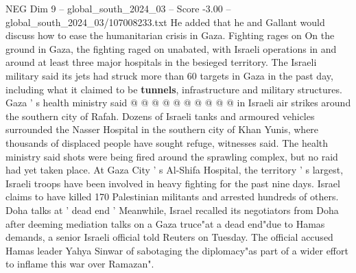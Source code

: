 \begin{textsample}{NEG Dim 9 – global\_south\_2024\_03 – Score -3.00 – global\_south\_2024\_03/107008233.txt}
He added that he and Gallant would discuss how to ease the humanitarian crisis in Gaza.
Fighting rages on On the ground in Gaza, the fighting raged on unabated, with Israeli operations in and around at least three major hospitals in the besieged territory.
The Israeli military said its jets had struck more than 60 targets in Gaza in the past day, including what it claimed to be \textbf{tunnels}, infrastructure and military structures.
Gaza ' s health ministry said @ @ @ @ @ @ @ @ @ @ in Israeli air strikes around the southern city of Rafah.
Dozens of Israeli tanks and armoured vehicles surrounded the Nasser Hospital in the southern city of Khan Yunis, where thousands of displaced people have sought refuge, witnesses said.
The health ministry said shots were being fired around the sprawling complex, but no raid had yet taken place.
At Gaza City ' s Al-Shifa Hospital, the territory ' s largest, Israeli troops have been involved in heavy fighting for the past nine days.
Israel claims to have killed 170 Palestinian militants and arrested hundreds of others.
Doha talks at ' dead end ' Meanwhile, Israel recalled its negotiators from Doha after deeming mediation talks on a Gaza truce"at a dead end"due to Hamas demands, a senior Israeli official told Reuters on Tuesday.
The official accused Hamas leader Yahya Sinwar of sabotaging the diplomacy"as part of a wider effort to inflame this war over Ramazan".

\end{textsample}
